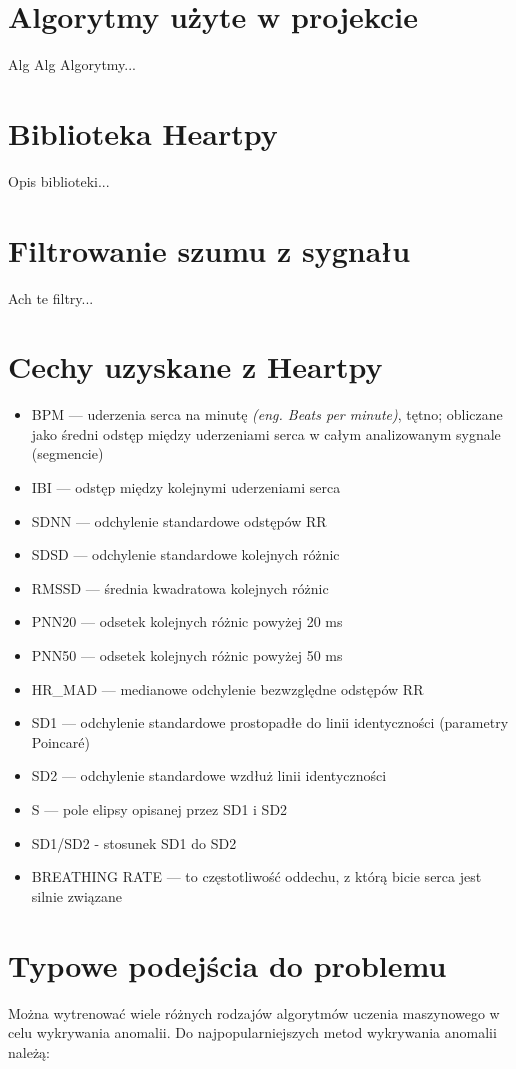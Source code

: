 \documentclass[12pt,a4paper]{article}
\begin{document}
\section{Algorytmy użyte w projekcie}
Alg Alg Algorytmy...

\section{Biblioteka Heartpy}
Opis biblioteki...

\section{Filtrowanie szumu z sygnału}
Ach te filtry...

\section{Cechy uzyskane z Heartpy}
\begin{itemize}
    \item BPM — uderzenia serca na minutę \textit{(eng. Beats per minute)}, tętno; obliczane jako średni odstęp między uderzeniami serca w całym analizowanym sygnale (segmencie)
    \item IBI — odstęp między kolejnymi uderzeniami serca
    \item SDNN — odchylenie standardowe odstępów RR
    \item SDSD — odchylenie standardowe kolejnych różnic
    \item RMSSD — średnia kwadratowa kolejnych różnic
    \item PNN20 — odsetek kolejnych różnic powyżej 20 ms
    \item PNN50 — odsetek kolejnych różnic powyżej 50 ms
    \item HR\_MAD — medianowe odchylenie bezwzględne odstępów RR
    \item SD1 — odchylenie standardowe prostopadłe do linii identyczności (parametry Poincaré)
    \item SD2 — odchylenie standardowe wzdłuż linii identyczności
    \item S — pole elipsy opisanej przez SD1 i SD2
    \item SD1/SD2 - stosunek SD1 do SD2
    \item BREATHING RATE — to częstotliwość oddechu, z którą bicie serca jest silnie związane
\end{itemize}

\section{Typowe podejścia do problemu}
\cite{3} Można wytrenować wiele różnych rodzajów algorytmów uczenia maszynowego w celu wykrywania anomalii. Do najpopularniejszych metod wykrywania anomalii należą:
\end{document}
